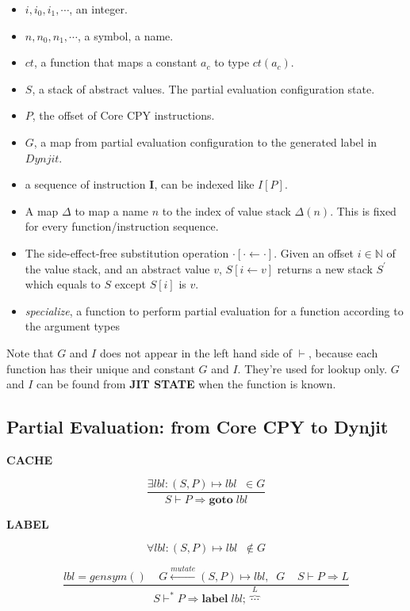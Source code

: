 \documentclass[12pt, a4paper]{report}
\newcommand{\rulegroup}[1]{
    \textbf{#1}
}
\newcommand{\gap}{ \;\;\;\; }
\begin{document}
\begin{itemize}
    \item $i, i_0, i_1, \cdots$, an integer.
    \item $n, n_0, n_1, \cdots$, a symbol, a name.
    \item $ct$, a function that maps a constant $a_c$ to type $ct(a_c)$.
    \item $S$, a stack of abstract values. The partial evaluation configuration state.
    \item $P$, the offset of Core CPY instructions.
    \item $G$, a map from partial evaluation configuration to the generated label in $Dynjit$.
    \item a sequence of instruction $\mathbf{I}$, can be indexed like $I[P]$.
    \item A map $\Delta$ to map a name $n$ to the index of value stack $\Delta(n)$. This is fixed for every function/instruction sequence.
    \item The side-effect-free substitution operation $\cdot[\cdot \leftarrow \cdot]$.
          Given an offset $i \in \mathbb{N}$ of the value stack, and an abstract value $v$,
          $S[i \leftarrow v]$ returns a new stack $S^{'}$ which equals to $S$ except $S[i]$ is $v$.
    \item \textit{specialize}, a function to perform partial evaluation for a function according to the argument types
\end{itemize}

Note that $G$ and $I$ does not appear in the left hand side of $\vdash$, because each function has their unique and constant $G$ and $I$.
They're used for lookup only. $G$ and $I$ can be found from \textbf{JIT STATE} when the function is known.

\subsection*{Partial Evaluation: from Core CPY to Dynjit}

\hrulefill
\bigbreak

\rulegroup{CACHE}
$$
\dfrac{
    \exists \mathit{lbl} : (S, P) \mapsto \mathit{lbl} \; \; \in G
}{
    S \vdash P \Rightarrow \mathbf{goto} \; \mathit{lbl}
}
$$

\rulegroup{LABEL}

$$
\forall \mathit{lbl} : (S, P) \mapsto \mathit{lbl} \;\; \notin G
$$

\vspace*{-\baselineskip}
$$
\dfrac{
    \mathit{lbl} = gensym()
    \gap
    G \overset{mutate}{\leftarrow} (S, P) \mapsto \mathit{lbl}, \;\;  G
    \gap
    S \vdash P \Rightarrow L
}{
    S \vdash^{*} P \Rightarrow \mathbf{label} \; \mathit{lbl} ; \; \overbrace{\cdots}^{L}
}
$$
\end{document}
